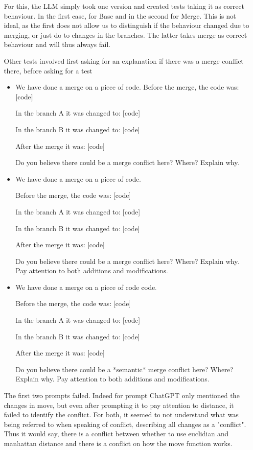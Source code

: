 For this, the LLM simply took one version and created tests taking it as correct behaviour. In the first case, for Base and in the second for Merge. This is not ideal, as the first does not allow us to distinguish if the behaviour changed due to merging, or just do to changes in the branches. The latter takes merge as correct behaviour and will thus always fail.

Other tests involved first asking for an explanation if there was a merge conflict there, before asking for a test

\begin{itemize}
  \item We have done a merge on a piece of code.
Before the merge, the code was: [code]

In the branch A it was changed to: [code]

In the branch B it was changed to: [code]

After the merge it was: [code]

Do you believe there could be a merge conflict here? Where? Explain why.
  \item We have done a merge on a piece of code.
  
Before the merge, the code was: [code]

In the branch A it was changed to: [code]

In the branch B it was changed to: [code]

After the merge it was: [code]

Do you believe there could be a merge conflict here? Where? Explain why. Pay attention to both additions and modifications.
  \item We have done a merge on a piece of code code.
  
Before the merge, the code was: [code]

In the branch A it was changed to: [code]

In the branch B it was changed to: [code]

After the merge it was: [code]

Do you believe there could be a *semantic* merge conflict here? Where? Explain why. Pay attention to both additions and modifications.

\end{itemize}

The first two prompts failed. Indeed for prompt ChatGPT only mentioned the changes in move, but even after prompting it to pay attention to distance, it failed to identify the conflict. For both, it seemed to not understand what was being referred to when speaking of conflict, describing all changes as a "conflict". Thus it would say, there is a conflict between whether to use euclidian and manhattan distance and there is a conflict on how the move function works.

